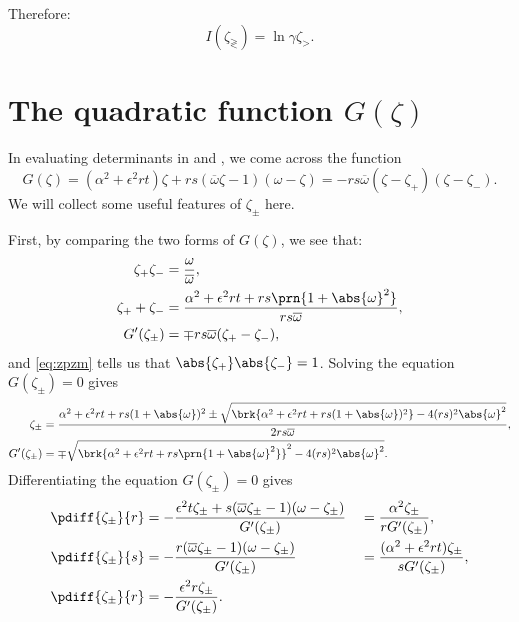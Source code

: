 \documentclass[12pt]{article}
\newcommand{\omb}{\overline{\omega}}
\newcommand{\opo}{\prn{1+\abs{\omega}^2}}
\begin{document}
Therefore:
%
\begin{equation}\label{eq:countourintresult}
  I(\zeta_\gtrless) = \ln\gamma\zeta_>.
\end{equation}
%


\section{The quadratic function \texorpdfstring{$G(\zeta)$}{G(zeta)}}\label{sec:Gamma}

In evaluating determinants in  and , we come across the function
%
\begin{equation}\label{eq:Gammadef}
  G(\zeta) = (\alpha^2+\epsilon^2rt)\zeta + rs(\omb\zeta-1)(\omega-\zeta) = - rs\omb (\zeta-\zeta_+) (\zeta-\zeta_-).
\end{equation}
%
We will collect some useful features of $\zeta_\pm$ here.

First, by comparing the two forms of $G(\zeta)$, we see that:
%
\begin{align}
\label{eq:zpzm}
  \zeta_+ \zeta_- &= \frac{\omega}{\omb},\\
  \label{eq:zppzm}
  \zeta_+ + \zeta_- &= \frac{\alpha^2+\epsilon^2rt + rs\opo}{rs\omb},\\
  \label{eq:Gprime}
  G'(\zeta_\pm) &= \mp rs\omb(\zeta_+ - \zeta_-),
\end{align}
%
and \eqref{eq:zpzm} tells us that $\abs{\zeta_+} \abs{\zeta_-}=1$.
Solving the equation $G(\zeta_\pm)=0$ gives
%
\begin{align}
\label{eq:zetapm}
  \zeta_\pm &= \frac{ \alpha^2+\epsilon^2rt + rs(1+\abs{\omega})^2
     \pm \sqrt{\brk{\alpha^2+\epsilon^2rt + rs(1+\abs{\omega})^2}
       - 4(rs)^2\abs{\omega}^2} }{2rs\omb},\\
\label{eq:Gprimesol}
  G'(\zeta_\pm) &= \mp\sqrt{\brk{\alpha^2+\epsilon^2rt + rs\opo}^2
       - 4(rs)^2\abs{\omega}^2}.
\end{align}
%
Differentiating the equation $G(\zeta_\pm)=0$ gives
%
\begin{equation}\label{eq:dzpmdrst}
\begin{aligned}
  \pdiff{\zeta_\pm}{r} &=
    -\frac{\epsilon^2t\zeta_\pm + s(\omb\zeta_\pm-1)(\omega-\zeta_\pm)}{G'(\zeta_\pm)}
    &&= \frac{\alpha^2\zeta_\pm}{rG'(\zeta_\pm)},\\
  \pdiff{\zeta_\pm}{s} &=
    -\frac{r(\omb\zeta_\pm-1)(\omega-\zeta_\pm)}{G'(\zeta_\pm)}
    &&= \frac{(\alpha^2+\epsilon^2rt)\zeta_\pm}{sG'(\zeta_\pm)},\\
  \pdiff{\zeta_\pm}{r} &=
    -\frac{\epsilon^2r\zeta_\pm}{G'(\zeta_\pm)}.
\end{aligned}
\end{equation}
%








\end{document}
